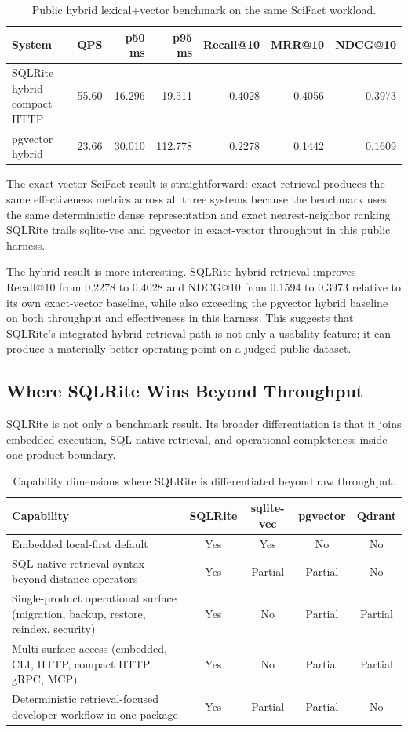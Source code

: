 \documentclass[11pt]{article}
\begin{document}
\begin{table}[H]
  \centering
  \small
  \caption{Public hybrid lexical+vector benchmark on the same SciFact workload.}
  \label{tab:publichybrid}
  \begin{tabular}{lrrrrrr}
    \toprule
    System & QPS & p50 ms & p95 ms & Recall@10 & MRR@10 & NDCG@10 \\
    \midrule
    SQLRite hybrid compact HTTP & 55.60 & 16.296 & 19.511 & 0.4028 & 0.4056 & 0.3973 \\
    pgvector hybrid & 23.66 & 30.010 & 112.778 & 0.2278 & 0.1442 & 0.1609 \\
    \bottomrule
  \end{tabular}
\end{table}

The exact-vector SciFact result is straightforward: exact retrieval produces the same effectiveness metrics across all three systems because the benchmark uses the same deterministic dense representation and exact nearest-neighbor ranking. SQLRite trails sqlite-vec and pgvector in exact-vector throughput in this public harness.

The hybrid result is more interesting. SQLRite hybrid retrieval improves Recall@10 from 0.2278 to 0.4028 and NDCG@10 from 0.1594 to 0.3973 relative to its own exact-vector baseline, while also exceeding the pgvector hybrid baseline on both throughput and effectiveness in this harness. This suggests that SQLRite's integrated hybrid retrieval path is not only a usability feature; it can produce a materially better operating point on a judged public dataset.

\subsection{Where SQLRite Wins Beyond Throughput}
SQLRite is not only a benchmark result. Its broader differentiation is that it joins embedded execution, SQL-native retrieval, and operational completeness inside one product boundary.

\begin{table}[H]
  \centering
  \small
  \caption{Capability dimensions where SQLRite is differentiated beyond raw throughput.}
  \label{tab:capabilities}
  \begin{tabularx}{\textwidth}{p{4.1cm}cccc}
    \toprule
    Capability & SQLRite & sqlite-vec & pgvector & Qdrant \\
    \midrule
    Embedded local-first default & Yes & Yes & No & No \\
    SQL-native retrieval syntax beyond distance operators & Yes & Partial & Partial & No \\
    Single-product operational surface (migration, backup, restore, reindex, security) & Yes & No & Partial & Partial \\
    Multi-surface access (embedded, CLI, HTTP, compact HTTP, gRPC, MCP) & Yes & No & Partial & Partial \\
    Deterministic retrieval-focused developer workflow in one package & Yes & Partial & Partial & No \\
    \bottomrule
  \end{tabularx}
\end{table}
\end{document}
